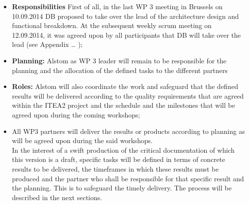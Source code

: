 \begin{itemize}
\item\textbf{Responsibilities} First of all, in the last WP 3 meeting in Brussels on  10.09.2014 DB proposed to take over the lead of the architecture design and functional breakdown. At the subsequent weekly scrum meeting on 12.09.2014,  it was agreed upon by all participants that DB will take over the lead (see Appendix … );\\
\item\textbf{Planning:} Alstom as WP 3 leader will remain to be responsible for the planning and the allocation of the defined tasks to the different partners\\
\item\textbf{Roles:} Alstom will also coordinate the work and safeguard that the defined results will be delivered according to the quality requirements that are agreed within the ITEA2 project and the schedule and the milestones that will be agreed upon during the coming workshops;\\
\item All WP3 partners will deliver the results or products according to planning as will be agreed upon during the said workshops. \\

In the interest of a swift production of the critical documentation of which this version is a draft, specific tasks will be defined in terms of concrete results to be delivered, the timeframes in which these results must be produced and the partner who shall be responsible for that specific result and the planning. This is to safeguard the timely delivery. The process will be described in the next sections.\\
\end{itemize}


